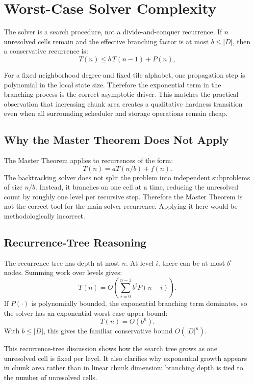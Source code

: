 \documentclass[12pt,a4paper]{report}
\begin{document}
\section{Worst-Case Solver Complexity}
The solver is a search procedure, not a divide-and-conquer recurrence. If $n$ unresolved cells remain and the effective branching factor is at most $b \le |D|$, then a conservative recurrence is:
\[
T(n) \le b \, T(n-1) + P(n),
\]

For a fixed neighborhood degree and fixed tile alphabet, one propagation step is polynomial in the local state size. Therefore the exponential term in the branching process is the correct asymptotic driver. This matches the practical observation that increasing chunk area creates a qualitative hardness transition even when all surrounding scheduler and storage operations remain cheap.

\subsection{Why the Master Theorem Does Not Apply}
The Master Theorem applies to recurrences of the form:
\[
T(n) = aT(n/b) + f(n).
\]
The backtracking solver does not split the problem into independent subproblems of size $n/b$. Instead, it branches on one cell at a time, reducing the unresolved count by roughly one level per recursive step. Therefore the Master Theorem is not the correct tool for the main solver recurrence. Applying it here would be methodologically incorrect.

\subsection{Recurrence-Tree Reasoning}
The recurrence tree has depth at most $n$. At level $i$, there can be at most $b^i$ nodes. Summing work over levels gives:
\[
T(n) = O\!\left(\sum_{i=0}^{n-1} b^i P(n-i)\right).
\]
If $P(\cdot)$ is polynomially bounded, the exponential branching term dominates, so the solver has an exponential worst-case upper bound:
\[
T(n) = O(b^n).
\]
With $b \le |D|$, this gives the familiar conservative bound $O(|D|^n)$.

This recurrence-tree discussion shows how the search tree grows as one unresolved cell is fixed per level. It also clarifies why exponential growth appears in chunk area rather than in linear chunk dimension: branching depth is tied to the number of unresolved cells.
\end{document}
